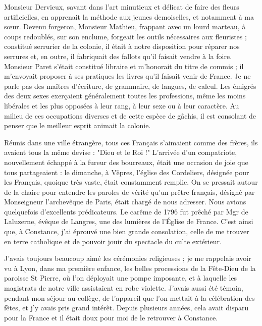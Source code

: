 \documentclass[11pt,a4paper]{report}
\begin{document}
Monsieur Dervieux, savant dans l'art minutieux et délicat de faire des fleurs artificielles, en apprenait la méthode aux jeunes demoiselles, et notamment à ma sœur. Devenu forgeron, Monsieur Mathieu, frappant avec un lourd marteau, à coups redoublés, sur son enclume, forgeait les outils nécessaires aux fleuristes ; constitué serrurier de la colonie, il était à notre disposition pour réparer nos serrures et, en outre, il fabriquait des fallots qu'il faisait vendre à la foire. Monsieur Paret s'était constitué libraire et m'honorait du titre de commis ; il m'envoyait proposer à ses pratiques les livres qu'il faisait venir de France. Je ne parle pas des maîtres d'écriture, de grammaire, de langues, de calcul. Les émigrés des deux sexes exerçaient généralement toutes les professions, même les moins libérales et les plus opposées à leur rang, à leur sexe ou à leur caractère. Au milieu de ces occupations diverses et de cette espèce de gâchis, il est consolant de penser que le meilleur esprit animait la colonie.

\vspace{0.3cm}\hrulefill\vspace{0.3cm}

Réunis dans une ville étrangère, tous ces Français s'aimaient comme des frères, ils avaient tous la même devise : "Dieu et le Roi !" L'arrivée d'un compatriote, nouvellement échappé à la fureur des bourreaux, était une occasion de joie que tous partageaient : le dimanche, à Vêpres, l'église des Cordeliers, désignée pour les Français, quoique très vaste, était constamment remplie. On se pressait autour de la chaire pour entendre les paroles de vérité qu'un prêtre français, désigné par Monseigneur l'archevêque de Paris, était chargé de nous adresser. Nous avions quelquefois d'excellents prédicateurs. Le carême de 1796 fut prêché par Mgr de Laluzerne, évêque de Langres, une des lumières de l'Église de France. C'est ainsi que, à Constance, j'ai éprouvé une bien grande consolation, celle de me trouver en terre catholique et de pouvoir jouir du spectacle du culte extérieur.

J'avais toujours beaucoup aimé les cérémonies religieuses ; je me rappelais avoir vu à Lyon, dans ma première enfance, les belles processions de la Fête-Dieu de la paroisse St Pierre, où l'on déployait une pompe imposante, et à laquelle les magistrats de notre ville assistaient en robe violette. J'avais aussi été témoin, pendant mon séjour au collège, de l'appareil que l'on mettait à la célébration des fêtes, et j'y avais pris grand intérêt. Depuis plusieurs années, cela avait disparu pour la France et il était doux pour moi de le retrouver à Constance.
\end{document}
